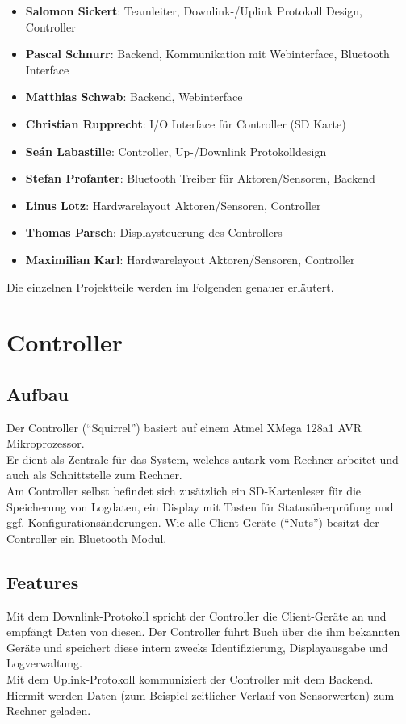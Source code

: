 \documentclass[12pt,a4paper]{article}
\begin{document}
\begin{itemize}
	\item {\bf Salomon Sickert}: Teamleiter, Downlink-/Uplink Protokoll Design, Controller
	\item {\bf Pascal Schnurr}: Backend, Kommunikation mit Webinterface, Bluetooth Interface
	\item {\bf Matthias Schwab}: Backend, Webinterface
	\item {\bf Christian Rupprecht}: I/O Interface für Controller (SD Karte)
	\item {\bf Seán Labastille}: Controller, Up-/Downlink Protokolldesign
	\item {\bf Stefan Profanter}: Bluetooth Treiber für Aktoren/Sensoren, Backend
	\item {\bf Linus Lotz}: Hardwarelayout Aktoren/Sensoren, Controller
	\item {\bf Thomas Parsch}: Displaysteuerung des Controllers
	\item {\bf Maximilian Karl}: Hardwarelayout Aktoren/Sensoren, Controller
\end{itemize}
Die einzelnen Projektteile werden im Folgenden genauer erläutert.

\section{Controller}

\subsection{Aufbau}

Der Controller (``Squirrel'') basiert auf einem Atmel XMega 128a1 AVR Mikroprozessor. \\
Er dient als Zentrale für das System, welches autark vom Rechner arbeitet und auch als Schnittstelle zum Rechner. \\
Am Controller selbst befindet sich zusätzlich ein SD-Kartenleser für die Speicherung von Logdaten, ein Display mit Tasten für Statusüberprüfung und ggf. Konfigurationsänderungen.
Wie alle Client-Geräte (``Nuts'') besitzt der Controller ein Bluetooth Modul.

\subsection{Features}

Mit dem Downlink-Protokoll spricht der Controller die Client-Geräte an und empfängt Daten von diesen. Der Controller führt Buch über die ihm bekannten Geräte und speichert diese intern zwecks Identifizierung, Displayausgabe und Logverwaltung.\\
Mit dem Uplink-Protokoll kommuniziert der Controller mit dem Backend. Hiermit werden Daten (zum Beispiel zeitlicher Verlauf von Sensorwerten) zum Rechner geladen. \\
\end{document}
